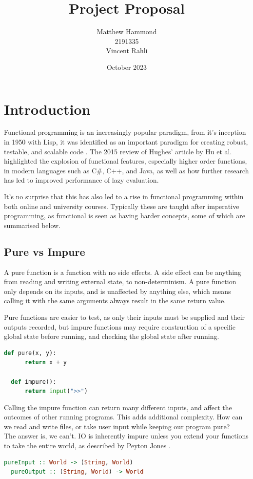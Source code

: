 \documentclass[a4paper]{article}
\title{Project Proposal}
\author{Matthew Hammond\\2191335\\Vincent Rahli}
\date{October 2023}
\begin{document}
\maketitle

\section{Introduction}
Functional programming is an increasingly popular paradigm, from it's inception in 1950 with Lisp, it was identified as an important paradigm for creating robust, testable, and scalable code \cite{10.1093/comjnl/32.2.98}. The 2015 review of Hughes' article by Hu et al. \cite{10.1093/nsr/nwv042} highlighted the explosion of functional features, especially higher order functions, in modern languages such as C\#, C++, and Java, as well as how further research has led to improved performance of lazy evaluation.

It's no surprise that this has also led to a rise in functional programming within both online and university courses. \cite{warwickFP, kentFP, birminghamFP, courseraFP} Typically these are taught after imperative programming, as functional is seen as having harder concepts, some of which are summarised below.
\subsection{Pure vs Impure}
A pure function is a function with no side effects. A side effect can be anything from reading and writing external state, to non-determinism. A pure function only depends on its inputs, and is unaffected by anything else, which means calling it with the same arguments always result in the same return value.

Pure functions are easier to test, as only their inputs must be supplied and their outputs recorded, but impure functions may require construction of a specific global state before running, and checking the global state after running.
\begin{lstlisting}[language=python, caption=A pure and impure function.]
  def pure(x, y):
      return x + y

  def impure():
      return input(">>")
\end{lstlisting}
Calling the impure function can return many different inputs, and affect the outcomes of other running programs.
This adds additional complexity. How can we read and write files, or take user input while keeping our program pure?\\
The answer is, we can't. IO is inherently impure unless you extend your functions to take the entire world, as described by Peyton Jones \cite{peytonjones2001tackling}.
\begin{lstlisting}[language=haskell]
  pureInput :: World -> (String, World)
  pureOutput :: (String, World) -> World
\end{lstlisting}
\end{document}
